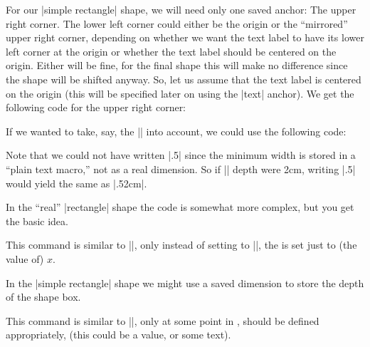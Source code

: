\begin{command}{\pgfdeclareshape{}}
\begin{command}{\savedanchor{}}
    For our |simple rectangle| shape, we will need only one saved
    anchor: The upper right corner. The lower left corner could either
    be the origin or the ``mirrored'' upper right corner, depending on
    whether we want the text label to have its lower left corner at
    the origin or whether the text label should be centered on the
    origin. Either will be fine, for the final shape this will make no
    difference since the shape will be shifted anyway. So, let us
    assume that the text label is centered on the origin (this will be
    specified later on using the |text| anchor). We get
    the following code for the upper right corner:
\begin{codeexample}
\savedanchor{\upperrightcorner}{
  \pgf@y=.5\ht\pgfnodeparttextbox %
  \pgf@x=.5\wd\pgfnodeparttextbox %
}
\end{codeexample}

    If we wanted to take, say, the |\pgfshapeminwidth| into account,
    we could use the following code:

\begin{codeexample}
\end{codeexample}
    Note that we could not have written |.5\pgfshapeminwidth| since
    the minimum width is stored in a ``plain text macro,'' not as a
    real dimension. So if |\pgfshapeminwidth| depth were
    2cm, writing |.5\pgfshapeminwidth| would yield the same as |.52cm|.

    In the ``real'' |rectangle| shape the code is somewhat more
    complex, but you get the basic idea.
  \end{command}
  \begin{command}{\saveddimen{}}
    This command is similar to |\savedanchor|, only instead of setting
     to ||, the  is
    set just to (the value of) $x$.

    In the |simple rectangle| shape we might use a saved dimension to
    store the depth of the shape box.

\begin{codeexample}
\saveddimen{\depth}{
  \pgf@x=\dp\pgfnodeparttextbox
}
\end{codeexample}
  \end{command}
  \begin{command}{\savedmacro{}}
    This command is similar to |\saveddimen|, only at some point
    in ,  should be defined appropriately,
    (this could be a value, or some text).


\end{command}
\end{command}
